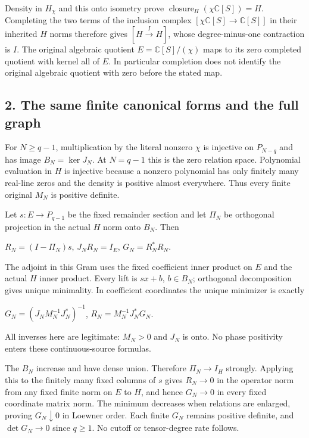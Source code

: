 \documentclass{article}
\begin{document}
Density in \(H_\chi\) and this onto isometry prove \(\operatorname{closure}_H(\chi\mathbb C[S])=H\). Completing the two terms of the inclusion complex \([\chi\mathbb C[S]\longrightarrow\mathbb C[S]]\) in their inherited \(H\) norms therefore gives \([H\xrightarrow{I}H]\), whose degree-minus-one contraction is \(I\). The original algebraic quotient \(E=\mathbb C[S]/(\chi)\) maps to its zero completed quotient with kernel all of \(E\). In particular completion does not identify the original algebraic quotient with zero before the stated map.

\subsection{2. The same finite canonical forms and the full graph}\label{the-same-finite-canonical-forms-and-the-full-graph}

For \(N\ge q-1\), multiplication by the literal nonzero \(\chi\) is injective on \(P_{N-q}\) and has image \(B_N=\ker J_N\). At \(N=q-1\) this is the zero relation space. Polynomial evaluation in \(H\) is injective because a nonzero polynomial has only finitely many real-line zeros and the density is positive almost everywhere. Thus every finite original \(M_N\) is positive definite.

Let \(s:E\longrightarrow P_{q-1}\) be the fixed remainder section and let \(\Pi_N\) be orthogonal projection in the actual \(H\) norm onto \(B_N\). Then

\(R_N=(I-\Pi_N)s\), \(J_NR_N=I_E\), \(G_N=R_N^*R_N\).

The adjoint in this Gram uses the fixed coefficient inner product on \(E\) and the actual \(H\) inner product. Every lift is \(sx+b\), \(b\in B_N\); orthogonal decomposition gives unique minimality. In coefficient coordinates the unique minimizer is exactly

\(G_N=(J_NM_N^{-1}J_N^*)^{-1}\), \(R_N=M_N^{-1}J_N^*G_N\).

All inverses here are legitimate: \(M_N>0\) and \(J_N\) is onto. No phase positivity enters these continuous-source formulas.

The \(B_N\) increase and have dense union. Therefore \(\Pi_N\longrightarrow I_H\) strongly. Applying this to the finitely many fixed columns of \(s\) gives \(R_N\longrightarrow0\) in the operator norm from any fixed finite norm on \(E\) to \(H\), and hence \(G_N\longrightarrow0\) in every fixed coordinate matrix norm. The minimum decreases when relations are enlarged, proving \(G_N\downarrow0\) in Loewner order. Each finite \(G_N\) remains positive definite, and \(\det G_N\longrightarrow0\) since \(q\ge1\). No cutoff or tensor-degree rate follows.
\end{document}
